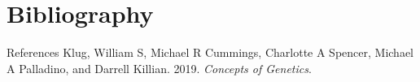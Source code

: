 \documentclass[11pt,dvipsnames,ignorenonframetext,aspectratio=169]{beamer}
\newlength{\cslhangindent}
\newenvironment{cslreferences}%
    {\setlength{\parindent}{0pt}%
    \everypar{\setlength{\hangindent}{\cslhangindent}}\ignorespaces}%
    {\par}
\begin{document}
\begin{frame}{}
\begin{figure}
\begin{columns}[T,onlytextwidth]
\label{fig:pcr}
\end{columns}
\end{figure}
\end{frame}

\hypertarget{bibliography}{%
\section{Bibliography}\label{bibliography}}

\begin{frame}{References}
\protect\hypertarget{references}{}
\hypertarget{refs}{}
\begin{cslreferences}
\leavevmode\hypertarget{ref-klug2019concepts}{}%
Klug, William S, Michael R Cummings, Charlotte A Spencer, Michael A
Palladino, and Darrell Killian. 2019. \emph{Concepts of Genetics}.
\end{cslreferences}
\end{frame}
\end{document}
